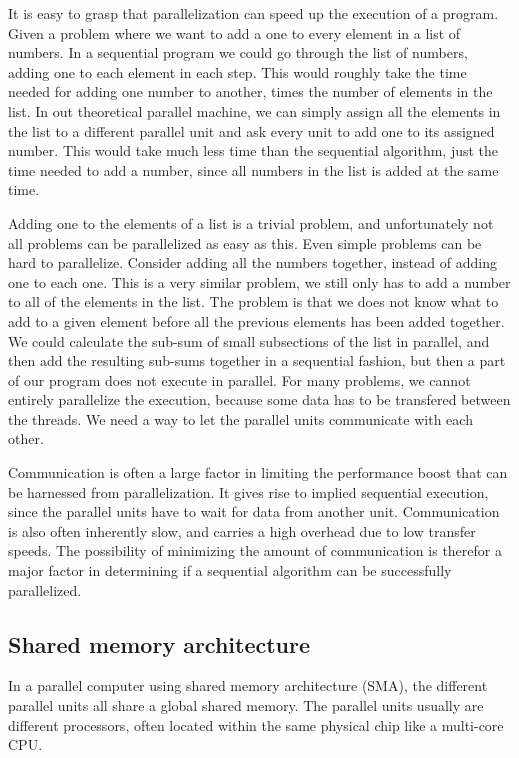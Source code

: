 It is easy to grasp that parallelization can speed up the execution of a program. Given a problem where we want to add a one to every element in a list of numbers. In a sequential program we could go through the list of numbers, adding one to each element in each step. This would roughly take the time needed for adding one number to another, times the number of elements in the list. In out theoretical parallel machine, we can simply assign all the elements in the list to a different parallel unit and ask every unit to add one to its assigned number. This would take much less time than the sequential algorithm, just the time needed to add a number, since all numbers in the list is added at the same time.

Adding one to the elements of a list is a trivial problem, and unfortunately not all problems can be parallelized as easy as this. Even simple problems can be hard to parallelize. Consider adding all the numbers together, instead of adding one to each one. This is a very similar problem, we still only has to add a number to all of the elements in the list. The problem is that we does not know what to add to a given element before all the previous elements has been added together. We could calculate the sub-sum of small subsections of the list in parallel, and then add the resulting sub-sums together in a sequential fashion, but then a part of our program does not execute in parallel. For many problems, we cannot entirely parallelize the execution, because some data has to be transfered between the threads. We need a way to let the parallel units communicate with each other.

Communication is often a large factor in limiting the performance boost that can be harnessed from parallelization. It gives rise to implied sequential execution, since the parallel units have to wait for data from another unit. Communication is also often inherently slow, and carries a high overhead due to low transfer speeds. The possibility of minimizing the amount of communication is therefor a major factor in determining if a sequential algorithm can be successfully parallelized.

\subsection{Shared memory architecture} %
\label{sub:shared_memory_architecture}
In a parallel computer using shared memory architecture (SMA), the different parallel units all share a global shared memory. The parallel units usually are different processors, often located within the same physical chip like a multi-core CPU. 

